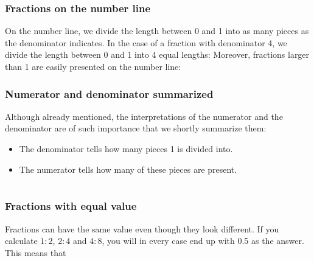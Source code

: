 \st{ \vs
{}
}

\newpage
\subsubsection{Fractions on the number line}
On the number line, we divide the length between 0 and 1 into as many pieces as the denominator indicates. In the case of a fraction with denominator 4, we divide the length between 0 and 1 into 4 equal lengths:
Moreover, fractions larger than 1 are easily presented on the number line:
\subsubsection{Numerator and denominator summarized}
Although already mentioned, the interpretations of the numerator and the denominator are of such importance that we shortly summarize them:
\begin{itemize}
	\item The denominator tells how many pieces 1 is divided into.
	\item The numerator tells how many of these pieces are present.
\end{itemize}
\newpage
\section{\brvu}
\subsubsection{Fractions with equal value}
Fractions can have the same value even though they look different. If you calculate $ 1:2 $, $ 2:4 $ and $ 4:8 $, you will in every case end up with 0.5 as the answer. This means that
 \\[5pt]
 \vsk
{}
